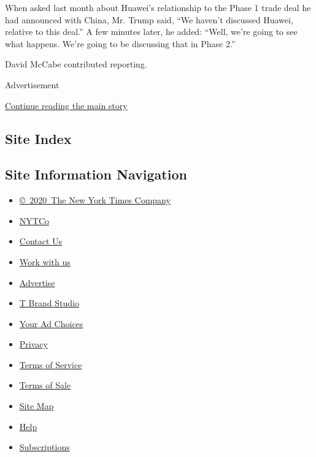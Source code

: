 When asked last month about Huawei's relationship to the Phase 1 trade
deal he had announced with China, Mr. Trump said, ``We haven't discussed
Huawei, relative to this deal.'' A few minutes later, he added: ``Well,
we're going to see what happens. We're going to be discussing that in
Phase 2.''

David McCabe contributed reporting.

Advertisement

\protect\hyperlink{after-bottom}{Continue reading the main story}

\hypertarget{site-index}{%
\subsection{Site Index}\label{site-index}}

\hypertarget{site-information-navigation}{%
\subsection{Site Information
Navigation}\label{site-information-navigation}}

\begin{itemize}
\tightlist
\item
  \href{https://help.nytimes.com/hc/en-us/articles/115014792127-Copyright-notice}{©~2020~The
  New York Times Company}
\end{itemize}

\begin{itemize}
\tightlist
\item
  \href{https://www.nytco.com/}{NYTCo}
\item
  \href{https://help.nytimes.com/hc/en-us/articles/115015385887-Contact-Us}{Contact
  Us}
\item
  \href{https://www.nytco.com/careers/}{Work with us}
\item
  \href{https://nytmediakit.com/}{Advertise}
\item
  \href{http://www.tbrandstudio.com/}{T Brand Studio}
\item
  \href{https://www.nytimes.com/privacy/cookie-policy\#how-do-i-manage-trackers}{Your
  Ad Choices}
\item
  \href{https://www.nytimes.com/privacy}{Privacy}
\item
  \href{https://help.nytimes.com/hc/en-us/articles/115014893428-Terms-of-service}{Terms
  of Service}
\item
  \href{https://help.nytimes.com/hc/en-us/articles/115014893968-Terms-of-sale}{Terms
  of Sale}
\item
  \href{https://spiderbites.nytimes.com}{Site Map}
\item
  \href{https://help.nytimes.com/hc/en-us}{Help}
\item
  \href{https://www.nytimes.com/subscription?campaignId=37WXW}{Subscriptions}
\end{itemize}
